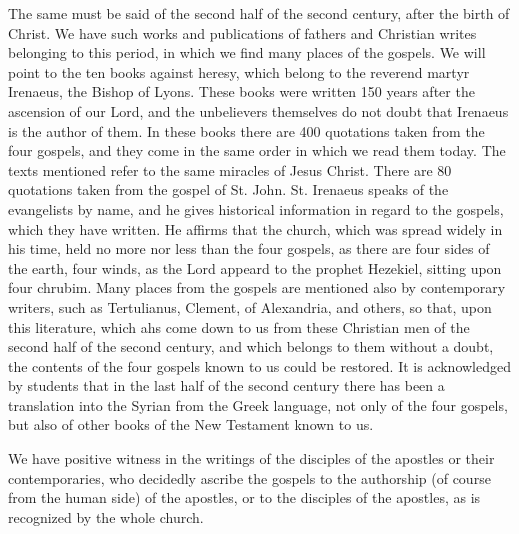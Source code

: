 The same must be said of the second half of the second century, after the birth of Christ. We have such works and publications of fathers and Christian writes belonging to this period, in which we find many places of the gospels. We will point to the ten books against heresy, which belong to the reverend martyr Irenaeus, the Bishop of Lyons. These books were written 150 years after the ascension of our Lord, and the unbelievers themselves do not doubt that Irenaeus is the author of them. In these books there are 400 quotations taken from the four gospels, and they come in the same order in which we read them today. The texts mentioned refer to the same miracles of Jesus Christ. There are 80 quotations taken from the gospel of St. John. St. Irenaeus speaks of the evangelists by name, and he gives historical information in regard to the gospels, which they have written. He affirms that the church, which was spread widely in his time, held no more nor less than the four gospels, as there are four sides of the earth, four winds, as the Lord appeard to the prophet Hezekiel, sitting upon four chrubim. Many places from the gospels are mentioned also by contemporary writers, such as Tertulianus, Clement, of Alexandria, and others, so that, upon this literature, which ahs come down to us from these Christian men of the second half of the second century, and which belongs to them without a doubt, the contents of the four gospels known to us could be restored. It is acknowledged by students that in the last half of the second century there has been a translation into the Syrian from the Greek language, not only of the four gospels, but also of other books of the New Testament known to us.

We have positive witness in the writings of the disciples of the apostles or their contemporaries, who decidedly ascribe the gospels to the authorship (of course from the human side) of the apostles, or to the disciples of the apostles, as is recognized by the whole church.

